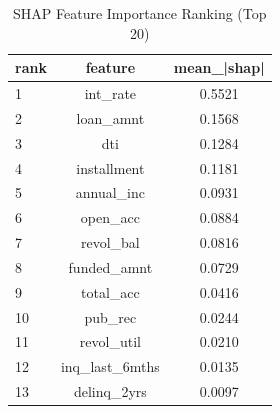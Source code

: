 \begin{table}
\centering
\caption{SHAP Feature Importance Ranking (Top 20)}
\label{tab:shap_ranking}
\begin{tabular}{lcc}
\toprule
rank & feature & mean_|shap| \\
\midrule
1 & int_rate & 0.5521 \\
2 & loan_amnt & 0.1568 \\
3 & dti & 0.1284 \\
4 & installment & 0.1181 \\
5 & annual_inc & 0.0931 \\
6 & open_acc & 0.0884 \\
7 & revol_bal & 0.0816 \\
8 & funded_amnt & 0.0729 \\
9 & total_acc & 0.0416 \\
10 & pub_rec & 0.0244 \\
11 & revol_util & 0.0210 \\
12 & inq_last_6mths & 0.0135 \\
13 & delinq_2yrs & 0.0097 \\
\bottomrule
\end{tabular}
\end{table}
